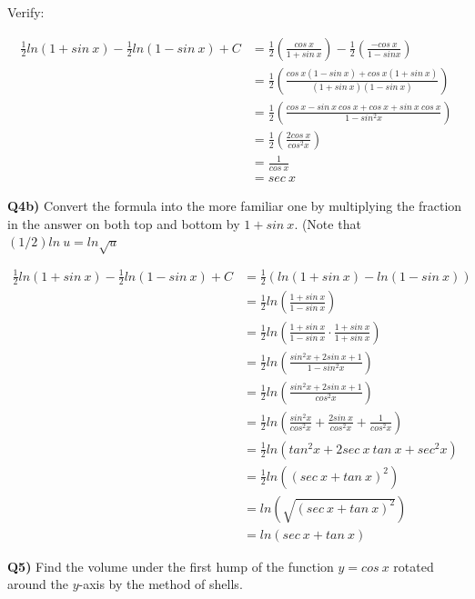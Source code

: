 \documentclass[9pt]{article}
\begin{document}
Verify:

\begin{align*}
  \frac{1}{2} ln(1 + sin \ x) - \frac{1}{2} ln(1 - sin \ x) + C &= \frac{1}{2} (\frac{cos \ x}{1 + sin \ x}) - \frac{1}{2} (\frac{- cos \ x}{1 - sin x}) \\
  &= \frac{1}{2} (\frac{cos \ x (1 - sin \ x) + cos \ x (1 + sin \ x)}{(1 + sin \ x)(1 - sin \ x)}) \\
  &= \frac{1}{2} (\frac{cos \ x - sin \ x \ cos \ x + cos \ x + sin \ x \ cos \ x}{1 - sin^2 x}) \\
  &= \frac{1}{2} (\frac{2 cos \ x}{cos^2 x}) \\
  &= \frac{1}{cos \ x} \\
  &= sec \ x
\end{align*}


\begin{tcolorbox}
  \textbf{Q4b)} Convert the formula into the more familiar one by multiplying the fraction in the answer on both top and bottom by $1 + sin \ x$. (Note that $(1 / 2) ln \ u = ln \sqrt{u}$
\end{tcolorbox}

\begin{align*}
  \frac{1}{2} ln(1 + sin \ x) - \frac{1}{2} ln(1 - sin \ x) + C &= \frac{1}{2} (ln(1 + sin \ x) - ln(1 - sin \ x)) \\
  &= \frac{1}{2} ln(\frac{1 + sin \ x}{1 - sin \ x}) \\
  &= \frac{1}{2} ln(\frac{1 + sin \ x}{1 - sin \ x} \cdot \frac{1 + sin \ x}{1 + sin \ x}) \\
  &= \frac{1}{2} ln(\frac{sin^2 x + 2 sin \ x + 1}{1 - sin^2 x}) \\
  &= \frac{1}{2} ln(\frac{sin^2 x + 2 sin \ x + 1}{cos^2 x}) \\
  &= \frac{1}{2} ln(\frac{sin^2 x}{cos^2 x} + \frac{2 sin \ x}{cos^2 x} + \frac{1}{cos^2 x}) \\
  &= \frac{1}{2} ln(tan^2 x + 2 sec \ x \ tan \ x + sec^2 x) \\
  &= \frac{1}{2} ln((sec \ x + tan \ x)^2) \\
  &= ln(\sqrt{(sec \ x + tan \ x)^2}) \\
  &= ln(sec \ x + tan \ x)
\end{align*}


\begin{tcolorbox}
  \textbf{Q5)} Find the volume under the first hump of the function $y = cos \ x$ rotated around the $y$-axis by the method of shells.
\end{tcolorbox}
\end{document}
